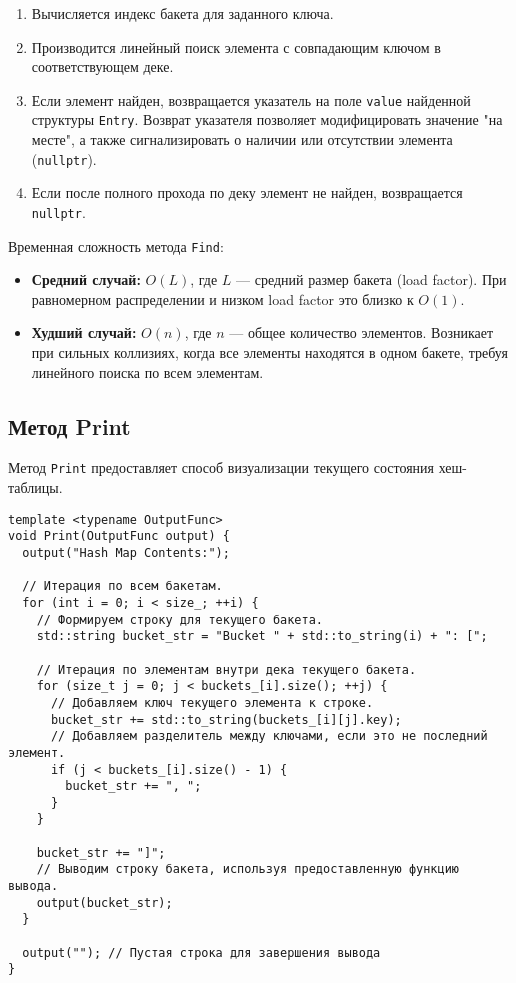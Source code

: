 \documentclass[a4paper,12pt]{article}
\begin{document}
\begin{enumerate}
    \item Вычисляется индекс бакета для заданного ключа.
    \item Производится линейный поиск элемента с совпадающим ключом в соответствующем деке.
    \item Если элемент найден, возвращается указатель на поле \texttt{value} найденной структуры \texttt{Entry}. Возврат указателя позволяет модифицировать значение "на месте", а также сигнализировать о наличии или отсутствии элемента (\texttt{nullptr}).
    \item Если после полного прохода по деку элемент не найден, возвращается \texttt{nullptr}.
\end{enumerate}

Временная сложность метода \texttt{Find}:
\begin{itemize}
    \item \textbf{Средний случай:} $O(L)$, где $L$ --- средний размер бакета (load factor). При равномерном распределении и низком load factor это близко к $O(1)$.
    \item \textbf{Худший случай:} $O(n)$, где $n$ --- общее количество элементов. Возникает при сильных коллизиях, когда все элементы находятся в одном бакете, требуя линейного поиска по всем элементам.
\end{itemize}

\subsection{Метод Print}

Метод \texttt{Print} предоставляет способ визуализации текущего состояния хеш-таблицы.

\begin{lstlisting}[style=cpp]
template <typename OutputFunc>
void Print(OutputFunc output) {
  output("Hash Map Contents:");
  
  // Итерация по всем бакетам.
  for (int i = 0; i < size_; ++i) {
    // Формируем строку для текущего бакета.
    std::string bucket_str = "Bucket " + std::to_string(i) + ": [";
    
    // Итерация по элементам внутри дека текущего бакета.
    for (size_t j = 0; j < buckets_[i].size(); ++j) {
      // Добавляем ключ текущего элемента к строке.
      bucket_str += std::to_string(buckets_[i][j].key);
      // Добавляем разделитель между ключами, если это не последний элемент.
      if (j < buckets_[i].size() - 1) {
        bucket_str += ", ";
      }
    }
    
    bucket_str += "]";
    // Выводим строку бакета, используя предоставленную функцию вывода.
    output(bucket_str);
  }
  
  output(""); // Пустая строка для завершения вывода
}
\end{lstlisting}
\end{document}
